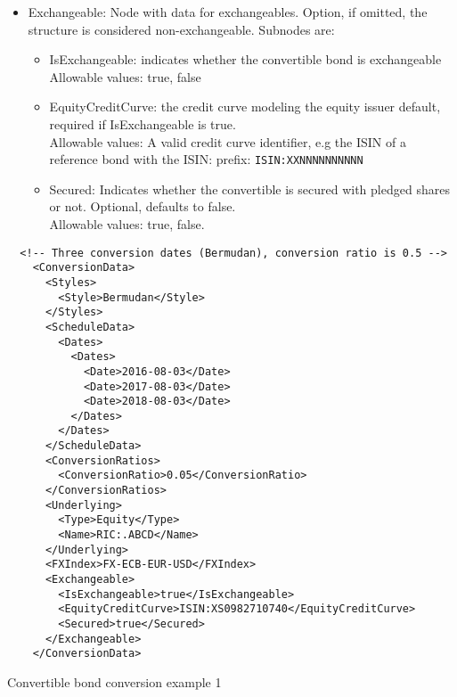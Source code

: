 \begin{itemize}
\item Exchangeable: Node with data for exchangeables. Option, if omitted, the structure is considered non-exchangeable. Subnodes are:\\
  \begin{itemize}
  \item IsExchangeable: indicates whether the convertible bond is exchangeable\\
    Allowable values: true, false
  \item EquityCreditCurve: the credit curve modeling the equity issuer default, required if IsExchangeable is
    true. \\
    Allowable values: A valid credit curve identifier, e.g the ISIN of a reference bond with the ISIN: prefix:
    \verb+ISIN:XXNNNNNNNNNN+
  \item Secured: Indicates whether the convertible is secured with pledged shares or not. Optional, defaults to false.\\
    Allowable values: true, false.
  \end{itemize}
\end{itemize}

\begin{listing}[H]
\begin{verbatim}
  <!-- Three conversion dates (Bermudan), conversion ratio is 0.5 -->
    <ConversionData>
      <Styles>
        <Style>Bermudan</Style>
      </Styles>
      <ScheduleData>
        <Dates>
          <Dates>
            <Date>2016-08-03</Date>
            <Date>2017-08-03</Date>
            <Date>2018-08-03</Date>
          </Dates>
        </Dates>
      </ScheduleData>
      <ConversionRatios>
        <ConversionRatio>0.05</ConversionRatio>
      </ConversionRatios>
      <Underlying>
        <Type>Equity</Type>
        <Name>RIC:.ABCD</Name>
      </Underlying>
      <FXIndex>FX-ECB-EUR-USD</FXIndex>
      <Exchangeable>
        <IsExchangeable>true</IsExchangeable>
        <EquityCreditCurve>ISIN:XS0982710740</EquityCreditCurve>
        <Secured>true</Secured>
      </Exchangeable>
    </ConversionData>
\end{verbatim}
\caption{Convertible bond conversion example 1}
\label{lst:convertiblebonddata_conversion_1}
\end{listing}


